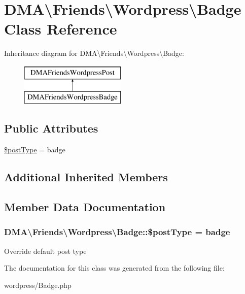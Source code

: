 \hypertarget{classDMA_1_1Friends_1_1Wordpress_1_1Badge}{}\section{D\+M\+A\textbackslash{}Friends\textbackslash{}Wordpress\textbackslash{}Badge Class Reference}
\label{classDMA_1_1Friends_1_1Wordpress_1_1Badge}
Inheritance diagram for D\+M\+A\textbackslash{}Friends\textbackslash{}Wordpress\textbackslash{}Badge\+:\begin{figure}[H]
\begin{center}
\leavevmode
\includegraphics[height=2.000000cm]{d8/d3a/classDMA_1_1Friends_1_1Wordpress_1_1Badge}
\end{center}
\end{figure}
\subsection*{Public Attributes}
\begin{DoxyCompactItemize}
\item 
\hyperlink{classDMA_1_1Friends_1_1Wordpress_1_1Badge_a3044aa841b86f76868023889de4ca114}{\$post\+Type} = \textquotesingle{}badge\textquotesingle{}
\end{DoxyCompactItemize}
\subsection*{Additional Inherited Members}


\subsection{Member Data Documentation}
\hypertarget{classDMA_1_1Friends_1_1Wordpress_1_1Badge_a3044aa841b86f76868023889de4ca114}{}
\subsubsection[{\$post\+Type}]{\setlength{\rightskip}{0pt plus 5cm}D\+M\+A\textbackslash{}\+Friends\textbackslash{}\+Wordpress\textbackslash{}\+Badge\+::\$post\+Type = \textquotesingle{}badge\textquotesingle{}}\label{classDMA_1_1Friends_1_1Wordpress_1_1Badge_a3044aa841b86f76868023889de4ca114}
Override default post type 

The documentation for this class was generated from the following file\+:\begin{DoxyCompactItemize}
\item 
wordpress/Badge.\+php\end{DoxyCompactItemize}
